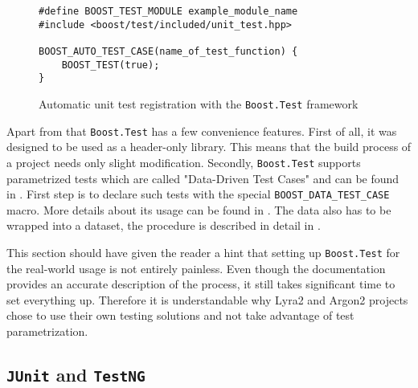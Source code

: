 \begin{figure}
\centering
\begin{verbatim}
#define BOOST_TEST_MODULE example_module_name
#include <boost/test/included/unit_test.hpp>

BOOST_AUTO_TEST_CASE(name_of_test_function) {
    BOOST_TEST(true);
}
  \end{verbatim}
  \caption{Automatic unit test registration with the \texttt{Boost.Test} framework}
  \label{figure:boost-auto-test-case}
  \end{figure}

Apart from that \texttt{Boost.Test} has a few convenience features. First of all, it was designed to be used as a header-only library. This means that the build process of a project needs only slight modification. Secondly, \texttt{Boost.Test} supports parametrized tests which are called "Data-Driven Test Cases" and can be found in \cite{boost:2017:test-data-driven}. First step is to declare such tests with the special \texttt{BOOST_DATA_TEST_CASE} macro. More details about its usage can be found in \cite{boost:2017:test-docs-data-macro}. The data also has to be wrapped into a dataset, the procedure is described in detail in \cite{boost:2017:test-docs-dataset}.

This section should have given the reader a hint that setting up \texttt{Boost.Test} for the real-world usage is not entirely painless. Even though the documentation provides an accurate description of the process, it still takes significant time to set everything up. Therefore it is understandable why Lyra2 and Argon2 projects chose to use their own testing solutions and not take advantage of test parametrization.

\subsection{\texttt{JUnit} and \texttt{TestNG}}
\label{sec:unit-junit-testng}

